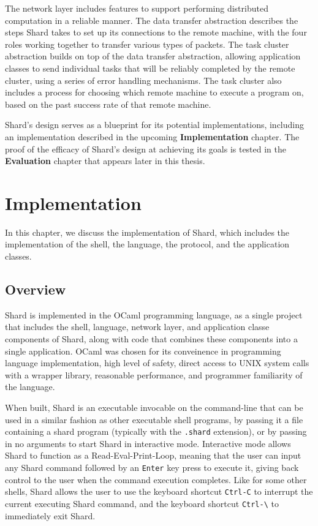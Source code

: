 \documentclass[twoside]{report}
\begin{document}
The network layer includes features to support performing distributed computation in a reliable manner.
The data transfer abstraction describes the steps Shard takes to set up its connections to the remote machine, with the four roles working together to transfer various types of packets.
The task cluster abstraction builds on top of the data transfer abstraction, allowing application classes to send individual tasks that will be reliably completed by the remote cluster, using a series of error handling mechanisms.
The task cluster also includes a process for choosing which remote machine to execute a program on, based on the past success rate of that remote machine.

Shard's design serves as a blueprint for its potential implementations, including an implementation described in the upcoming \textbf{Implementation} chapter.
The proof of the efficacy of Shard's design at achieving its goals is tested in the \textbf{Evaluation} chapter that appears later in this thesis.


\chapter{Implementation}

In this chapter, we discuss the implementation of Shard, which includes the implementation of the shell, the language, the protocol, and the application classes.

\section{Overview}

Shard is implemented in the OCaml programming language, as a single project that includes the shell, language, network layer, and application classe components of Shard, along with code that combines these components into a single application.
OCaml was chosen for its conveinence in programming language implementation, high level of safety, direct access to UNIX system calls with a wrapper library, reasonable performance, and programmer familiarity of the language.

When built, Shard is an executable invocable on the command-line that can be used in a similar fashion as other executable shell programs, by passing it a file containing a shard program (typically with the \texttt{.shard} extension), or by passing in no arguments to start Shard in interactive mode.
Interactive mode allows Shard to function as a Read-Eval-Print-Loop, meaning that the user can input any Shard command followed by an \texttt{Enter} key press to execute it, giving back control to the user when the command execution completes.
Like for some other shells, Shard allows the user to use the keyboard shortcut \texttt{Ctrl-C} to interrupt the current executing Shard command, and the keyboard shortcut \texttt{Ctrl-\textbackslash} to immediately exit Shard.
\end{document}
